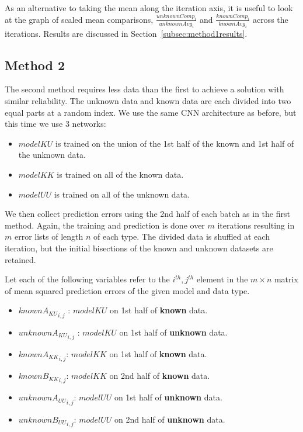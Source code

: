 \documentclass{acm_proc_article-sp}
\begin{document}
  As an alternative to taking the mean along the iteration axis, it is useful to look at the graph of scaled mean comparisons, $\frac{unknownComp_{i}}{unknownAvg_{i}}$ and $\frac{knownComp_{i}}{knownAvg_{i}}$ across the iterations. Results are discussed in Section~\ref{subsec:method1results}.

  \subsection{Method 2}
  \label{subsec:method2}

  The second method requires less data than the first to achieve a solution with similar reliability. The unknown data and known data are each divided into two equal parts at a random index. We use the same CNN architecture as before, but this time we use 3 networks:
  \begin{itemize}
   \item $modelKU$ is trained on the union of the 1st half of the known and 1st half of the unknown data.
   \item $modelKK$ is trained on all of the known data.
   \item $modelUU$ is trained on all of the unknown data.
  \end{itemize}
  We then collect prediction errors using the 2nd half of each batch as in the first method. Again, the training and prediction is done over $m$ iterations resulting in $m$  error lists of length $n$ of each type. The divided data is shuffled at each iteration, but the initial bisections of the known and unknown datasets are retained.
  
  Let each of the following variables refer to the $i^{th},j^{th}$ element in the $m \times n$ matrix of mean squared prediction errors of the given model and data type.
  \begin{itemize}
    \item ${knownA_{KU}}_{i,j}$ : $modelKU$ on 1st half of \textbf{known} data.
    \item ${unknownA_{KU}}_{i,j}$ : $modelKU$ on 1st half of \textbf{unknown} data.
    \item ${knownA_{KK}}_{i,j}$: $modelKK$ on 1st half of \textbf{known} data.
    \item ${knownB_{KK}}_{i,j}$: $modelKK$ on 2nd half of \textbf{known} data.
    \item ${unknownA_{UU}}_{i,j}$: $modelUU$ on 1st half of \textbf{unknown} data.
    \item ${unknownB_{UU}}_{i,j}$: $modelUU$ on 2nd half of \textbf{unknown} data. 
  \end{itemize}
  
\end{document}
